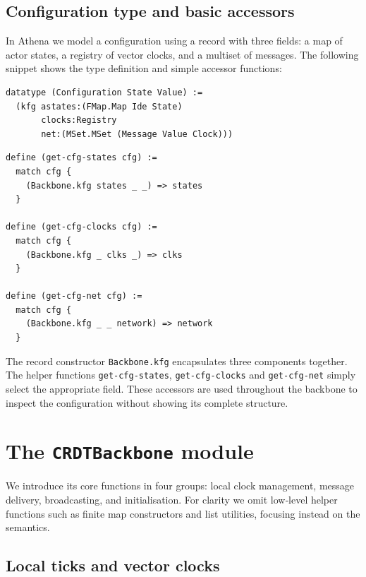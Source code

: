 \subsection{Configuration type and basic accessors}

In Athena we model a configuration using a record with three fields: a map of actor states, a registry of vector clocks, and a multiset of messages.  The following snippet shows the type definition and simple accessor functions:

\begin{lstlisting}[language=Athena,style=athena]
datatype (Configuration State Value) :=
  (kfg astates:(FMap.Map Ide State)
       clocks:Registry
       net:(MSet.MSet (Message Value Clock)))
\end{lstlisting}

\begin{lstlisting}[language=Athena,style=athena]
define (get-cfg-states cfg) :=
  match cfg {
    (Backbone.kfg states _ _) => states
  }

define (get-cfg-clocks cfg) :=
  match cfg {
    (Backbone.kfg _ clks _) => clks
  }

define (get-cfg-net cfg) :=
  match cfg {
    (Backbone.kfg _ _ network) => network
  }
\end{lstlisting}

The record constructor \lstinline{Backbone.kfg} encapsulates three components together.  The helper functions \lstinline{get-cfg-states}, \lstinline{get-cfg-clocks} and \lstinline{get-cfg-net} simply select the appropriate field.  These accessors are used throughout the backbone to inspect the configuration without showing its complete structure.

\section{The \texttt{CRDTBackbone} module}

We introduce its core functions in four groups: local clock management, message delivery, broadcasting, and initialisation. For clarity we omit low‑level helper functions such as finite map constructors and list utilities, focusing instead on the semantics.

\subsection{Local ticks and vector clocks}


